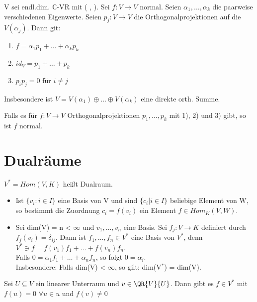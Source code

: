 \begin{theorem}
V sei endl.dim. $\mathbb{C}$-VR mit ( , ). Sei $f: V \to V$ normal. Seien $\alpha_1, …, \alpha_k$ die paarweise verschiedenen Eigenwerte. Seien $p_j: V \to V$ die Orthogonalprojektionen auf die $V(\alpha_j)$. Dann git:
\begin{enumerate}
\item $f = \alpha_1p_1 + … + \alpha_kp_k$
\item $id_V = p_1 + … + p_k$
\item $p_ip_j = 0$ für $i \neq j$
\end{enumerate}
Insbesondere ist $V = V(\alpha_1) \oplus … \oplus V(\alpha_k)$ eine direkte orth. Summe.
\end{theorem}

\begin{remark}
Falls es für $f: V \to V$ Orthogonalprojektionen $p_1, …, p_k$ mit 1), 2) und 3) gibt, so ist $f$ normal.
\end{remark}

\section{Dualräume}
\begin{definition}
$V^* = Hom(V, K)$ heißt Dualraum.
\end{definition}
\begin{theorem}
\leavevmode
\begin{itemize}
\item Ist $\{ v_i : i \in I \}$ eine Basis von V und sind $\{ c_i | i \in I \}$ beliebige Element von W, so bestimmt die Zuordnung $c_i = f(v_i)$ ein Element $f \in Hom_K(V,W)$.
\item Sei dim(V) = n < $\infty$ und $v_1, …, v_n$ eine Basis. Sei $f_j: V \to K$ definiert durch $f_j(v_i) = \delta_{ij}$. Dann ist $f_1, …, f_n \in V^*$ eine Basis von $V^*$, denn $V^* \ni f = f(v_1)f_1 + … + f(v_n)f_n$.\\
Falls $0 = \alpha_1 f_1 + … + \alpha_n f_n$, so folgt $0 = \alpha_i$.\\
Insbesondere: Falls dim(V) < $\infty$, so gilt: dim(V$^*$) = dim(V).
\end{itemize}
\end{theorem}

\begin{lemma}
Sei $U \subseteq V$ ein linearer Unterraum und $v \in \QR{V}{U}$. 
Dann gibt es $f \in V^*$ mit $f(u) = 0$ $\forall u \in u$ und $f(v) \neq 0$
\end{lemma}

